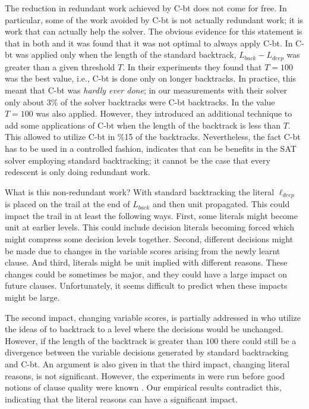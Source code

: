 \documentclass[runningheads]{llncs}
\newcommand{\sat}{SAT\xspace}
\newcommand{\deepestLvl}{L_{\textit{deep}}}
\newcommand{\deepestLit}{\ell_{\textit{deep}}}
\newcommand{\btL}{L_{\textit{back}}}
\newcommand{\cbt}{C-bt\xspace}
\begin{document}
The reduction in redundant work achieved by \cbt does not come for
free. In particular, some of the work avoided by \cbt is not actually
redundant work; it is work that can actually help the solver. The
obvious evidence for this statement is that in both
\cite{DBLP:conf/sat/NadelR18} and \cite{DBLP:conf/sat/MohleB19} it was
found that it was not optimal to always apply \cbt. In
\cite{DBLP:conf/sat/NadelR18} \cbt was applied only when the length of
the standard backtrack, $\btL-\deepestLvl$ was greater than a
given threshold $T$. In their experiments they found that $T=100$ was
the best value, i.e., \cbt is done only on longer backtracks. In
practice, this meant that \cbt was \emph{hardly ever done}; in our
measurements with their solver only about 3\% of the solver backtracks
were \cbt backtracks. In \cite{DBLP:conf/sat/MohleB19} the value
$T=100$ was also applied. However, they introduced an additional
technique to add some applications of \cbt when the length of the
backtrack is less than $T$. This allowed to utilize \cbt in \%15 of
the backtracks. Nevertheless, the fact \cbt has to be used in a
controlled fashion, indicates that can be benefits in the \sat solver
employing standard backtracking; it cannot be the case that every
redescent is only doing redundant work.

What is this non-redundant work? With standard backtracking the
literal $\deepestLit$ is placed on the trail at the end of $\btL$ and
then unit propagated. This could impact the trail in at least the
following ways. First, some literals might become unit at earlier
levels. This could include decision literals becoming forced which
might compress some decision levels together. Second, different
decisions might be made due to changes in the variable scores arising
from the newly learnt clause. And third, literals might be unit
implied with different reasons. These changes could be sometimes be
major, and they could have a large impact on future
clauses. Unfortunately, it seems difficult to predict when these
impacts might be large.

The second impact, changing variable scores, is partially addressed in
\cite{DBLP:conf/sat/MohleB19} who utilize the ideas of
\cite{DBLP:journals/jsat/TakRH11} to backtrack to a level where the
decisions would be unchanged. However, if the length of the backtrack
is greater than $100$ there could still be a divergence between the
variable decisions generated by standard backtracking and \cbt. An
argument is also given in \cite{DBLP:journals/jsat/TakRH11} that the
third impact, changing literal reasons, is not significant. However,
the experiments in \cite{DBLP:journals/jsat/TakRH11} were run before
good notions of clause quality were known
\cite{DBLP:conf/ijcai/AudemardS09}. Our empirical results contradict
this, indicating that the literal reasons can have a significant
impact.
\end{document}
